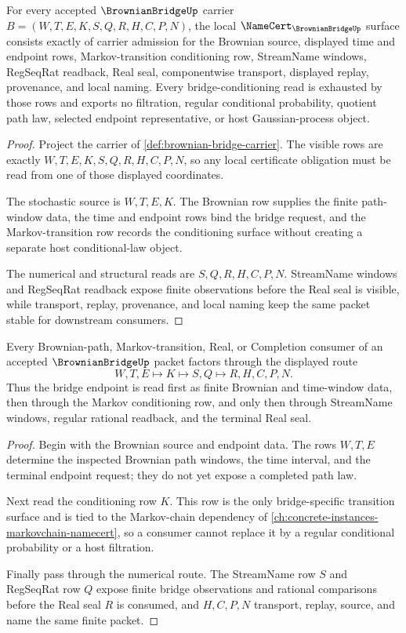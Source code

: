 \begin{theorem}
\label{thm:brownian-bridge-namecert-obligations}
For every accepted $\BrownianBridgeUp$ carrier $B=(W,T,E,K,S,Q,R,H,C,P,N)$, the local $\NameCert_{\BrownianBridgeUp}$ surface consists exactly of carrier admission for the Brownian source, displayed time and endpoint rows, Markov-transition conditioning row, StreamName windows, RegSeqRat readback, Real seal, componentwise transport, displayed replay, provenance, and local naming. Every bridge-conditioning read is exhausted by those rows and exports no filtration, regular conditional probability, quotient path law, selected endpoint representative, or host Gaussian-process object.
\end{theorem}
\begin{proof}
Project the carrier of \autoref{def:brownian-bridge-carrier}. The visible rows are exactly $W,T,E,K,S,Q,R,H,C,P,N$, so any local certificate obligation must be read from one of those displayed coordinates.

The stochastic source is $W,T,E,K$. The Brownian row supplies the finite path-window data, the time and endpoint rows bind the bridge request, and the Markov-transition row records the conditioning surface without creating a separate host conditional-law object.

The numerical and structural reads are $S,Q,R,H,C,P,N$. StreamName windows and RegSeqRat readback expose finite observations before the Real seal is visible, while transport, replay, provenance, and local naming keep the same packet stable for downstream consumers.
\end{proof}

\begin{theorem}
\label{thm:brownian-bridge-conditioning-route}
Every Brownian-path, Markov-transition, Real, or Completion consumer of an accepted $\BrownianBridgeUp$ packet factors through the displayed route
$$
W,T,E \longmapsto K \longmapsto S,Q \longmapsto R,H,C,P,N .
$$
Thus the bridge endpoint is read first as finite Brownian and time-window data, then through the Markov conditioning row, and only then through StreamName windows, regular rational readback, and the terminal Real seal.
\end{theorem}
\begin{proof}
Begin with the Brownian source and endpoint data. The rows $W,T,E$ determine the inspected Brownian path windows, the time interval, and the terminal endpoint request; they do not yet expose a completed path law.

Next read the conditioning row $K$. This row is the only bridge-specific transition surface and is tied to the Markov-chain dependency of \autoref{ch:concrete-instances-markovchain-namecert}, so a consumer cannot replace it by a regular conditional probability or a host filtration.

Finally pass through the numerical route. The StreamName row $S$ and RegSeqRat row $Q$ expose finite bridge observations and rational comparisons before the Real seal $R$ is consumed, and $H,C,P,N$ transport, replay, source, and name the same finite packet.
\end{proof}

